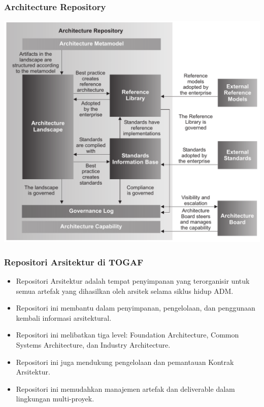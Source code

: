 \documentclass{beamer}
\begin{document}
	{
		\begin{frame}
			\frametitle{Architecture Repository}
			\begin{center}
				\includegraphics[width=.88\textwidth]{../figures/architecture_repository}
			\end{center}
		\end{frame}
	}
	
	\begin{frame}
		\frametitle{Repositori Arsitektur di TOGAF}
		\begin{itemize}
			\item Repositori Arsitektur adalah tempat penyimpanan yang terorganisir untuk semua artefak yang dihasilkan oleh arsitek selama siklus hidup ADM.
			\item Repositori ini membantu dalam penyimpanan, pengelolaan, dan penggunaan kembali informasi arsitektural.
			\item Repositori ini melibatkan tiga level: Foundation Architecture, Common Systems Architecture, dan Industry Architecture.
			\item Repositori ini juga mendukung pengelolaan dan pemantauan Kontrak Arsitektur.
			\item Repositori ini memudahkan manajemen artefak dan deliverable dalam lingkungan multi-proyek.
		\end{itemize}
	\end{frame}
\end{document}
